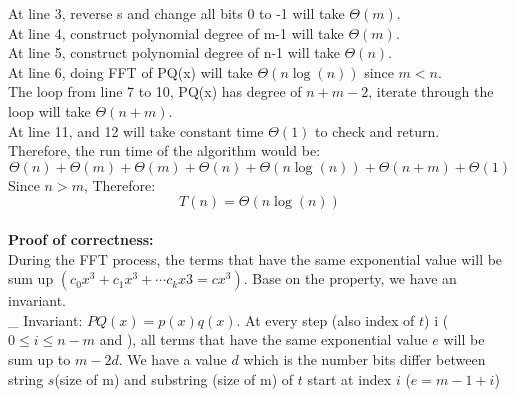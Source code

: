 \documentclass[11pt]{article}
\newenvironment{qparts}{\begin{enumerate}[{(}a{)}]}{\end{enumerate}}
\begin{document}
\begin{qparts}
At line 3, reverse s and change all bits 0 to -1 will take $\Theta(m)$.\\
At line 4, construct polynomial degree of m-1 will take $\Theta(m)$.\\
At line 5, construct polynomial degree of n-1 will take $\Theta(n)$.\\
At line 6, doing FFT of PQ(x) will take $\Theta(n\log(n))$ since $m < n$.\\
The loop from line 7 to 10, PQ(x) has degree of $n+m-2$, iterate through the loop will take $\Theta(n+m)$.\\
At line 11, and 12 will take constant time $\Theta(1)$ to check and return.\\
Therefore, the run time of the algorithm would be:
$$\Theta(n) + \Theta(m) + \Theta(m) + \Theta(n) + \Theta(n\log(n)) + \Theta(n + m) + \Theta(1)$$
Since $n > m$, Therefore:
$$\boxed{T(n) = \Theta(n\log(n))}$$
\\
\noindent
\textbf{Proof of correctness:}\\
During the FFT process, the terms that have the same exponential value will be sum up $(c_0x^3 + c_1x^3 + \cdots c_kx3 = cx^3)$. Base on the property, we have an invariant. \\
\_ Invariant:
$PQ(x) = p(x)q(x) $. At every step (also index of $t$) i  ($0 \leqslant i \leqslant n-m $ and ), all terms that have the same exponential value $e$ will be sum up to $m-2d$. We have a value $d $ which is the number bits differ between string $s$(size of m) and substring (size of m) of $t$ start at index $i$ ($e = m-1+i$)


\end{qparts}
\end{document}
